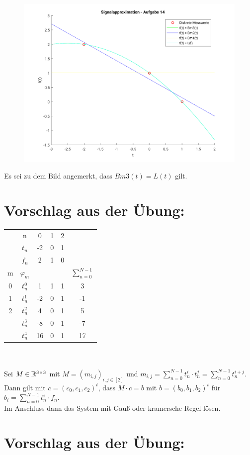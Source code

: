 	\begin{figure}
		\includegraphics[scale = 0.7]{A14_plot.png}
	\end{figure}
	Es sei zu dem Bild angemerkt, dass $Bm3(t) = L(t)$ gilt.
		\newpage
	\section*{Vorschlag aus der Übung:}
	\begin{tabular}{c c | c c c | c }
		& n		& 0		& 1		& \multicolumn{2}{l}{2}\\
		\cline{2-6}
		& $t_n$	& -2	& 0		& \multicolumn{2}{l}{1}\\
		& $f_n$	& 2		& 1		& \multicolumn{2}{l}{0}\\
		m	&$\varphi_m$&	&		&		&$\sum_{n=0}^{N-1}$\\
		\cline{1-6}
		0	& $t_n^0$	& 1 & 1		& 1		& 3\\
		1	& $t_n^1$	&-2	& 0		& 1		&-1\\
		2	& $t_n^2$	& 4	& 0		& 1		& 5\\
		\cline{1-6}
		& $t_n^3$	&-8	& 0		& 1		&-7\\
		& $t_n^4$	&16	& 0		& 1		&17
	\end{tabular}\\
	\\
	Sei $M\in {\mathbb R}^{3\times3}$ mit $M = (m_{i,j})_{i,j\in[2]}$ und $m_{i,j} = \sum_{n=0}^{N-1}t_n^i\cdot t_n^j = \sum_{n=0}^{N-1}t_n^{i+j}$. Dann gilt mit $c = (c_0,c_1,c_2)^t$, dass $M\cdot c = b$ mit $b = (b_0,b_1,b_2)^t$ für $b_i = \sum_{n=0}^{N-1}t_n^i\cdot f_n$.\\
	Im Anschluss dann das System mit Gauß oder kramersche Regel lösen.	
	\newpage
	\section*{Vorschlag aus der Übung:}
	\begin{tabular}{c c c c c c }
		
	\end{tabular}


